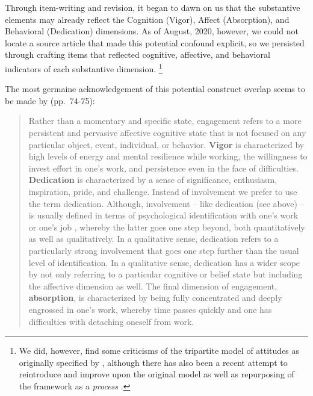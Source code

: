 \documentclass[
]{book}
\begin{document}
Through item-writing and revision, it began to dawn on us that the substantive elements may already reflect the Cognition (Vigor), Affect (Absorption), and Behavioral (Dedication) dimensions. As of August, 2020, however, we could not locate a source article that made this potential confound explicit, so we persisted through crafting items that reflected cognitive, affective, and behavioral indicators of each substantive dimension. \footnote{We did, however, find some criticisms of the tripartite model of attitudes as originally specified by \citet{rosenberg_cognitive_1960}, although there has also been a recent attempt to reintroduce and improve upon the original model \citep{kaiser_campbell_2019} as well as repurposing of the framework as a \emph{process} \citep[e.g., thoughts and feelings leading to behavior;][]{pachankis_psychological_2007}.}

The most germaine acknowledgement of this potential construct overlap seems to be made by \citet{schaufeli_measurement_2002} (pp.~74-75):

\begin{quote}
Rather than a momentary and specific state, engagement refers to a more persistent and pervasive affective cognitive state that is not focused on any particular object, event, individual, or behavior. \textbf{Vigor} is characterized by high levels of energy and mental resilience while working, the willingness to invest effort in one's work, and persistence even in the face of difficulties. \textbf{Dedication} is characterized by a sense of significance, enthusiasm, inspiration, pride, and challenge. Instead of involvement we prefer to use the term dedication. Although, involvement -- like dedication (see above) -- is usually defined in terms of psychological identification with one's work or one's job \citep{kanungo1982measurement, lawler1970relationship} , whereby the latter goes one step beyond, both quantitatively as well as qualitatively. In a qualitative sense, dedication refers to a particularly strong involvement that goes one step further than the usual level of identification. In a qualitative sense, dedication has a wider scope by not only referring to a particular cognitive or belief state but including the affective dimension as well. The final dimension of engagement, \textbf{absorption}, is characterized by being fully concentrated and deeply engrossed in one's work, whereby time passes quickly and one has difficulties with detaching oneself from work.
\end{quote}
\end{document}
